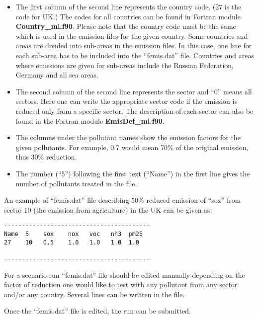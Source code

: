 \begin{itemize}

\item The first column of
the second line represents the country code. (27 is the code for UK.)
The codes for all countries can be found in  Fortran module {\bf
  Country\_ml.f90}. Please note that the country code must be the same
which is used in the emission files for the given country. Some
countries and areas are divided into sub-areas in the emission
files. In this case, one line for each sub-area has to be included
into the ``femis.dat'' file. Countries and areas where emissions are
given for sub-areas include the Russian Federation, Germany and all 
sea areas.    

\item The second
column of the second line 
represents the sector and ``0'' means all sectors. Here one can write
the appropriate sector code if the emission is reduced only from a specific
sector. The description of each sector can also be found in the Fortran
module {\bf EmisDef\_ml.f90}. 

\item The columns under the pollutant names show the emission factors
  for the given pollutants. For example, 0.7 would mean 70\% of the
  original emission, thus 30\% reduction.


\item The number (``5'') following
the first text (``Name'') in the first line gives the number of
pollutants treated in the file.   
              
\end{itemize}

An example of ``femis.dat'' file describing 50\% reduced emission of
``sox'' from sector 10 (the emission from agriculture) in the UK can be given as:  

\begin{verbatim}
-----------------------------------------
Name  5    sox    nox   voc   nh3  pm25 
27    10   0.5    1.0   1.0   1.0  1.0   

-----------------------------------------
\end{verbatim}        

For a scenario run ``femis.dat'' file should be edited 
manually depending on the factor of
reduction one would like to test with any pollutant from any sector
and/or any country. Several lines can be written in the file.

Once the ``femis.dat''  file is
edited, the run can be submitted.  



